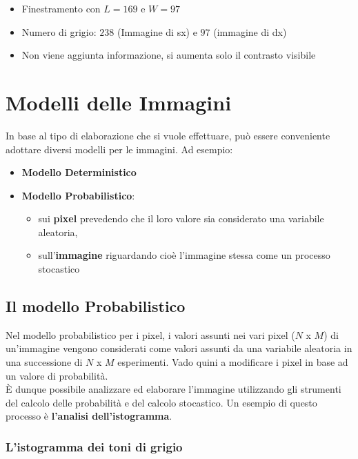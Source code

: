 \begin{itemize}
    \item Finestramento con $L = 169$ e $W = 97$
    \item Numero di grigio: $238$ (Immagine di sx) e $97$ (immagine di dx)
    \item Non viene aggiunta informazione, si aumenta solo il contrasto visibile
\end{itemize}

\section{Modelli delle Immagini}

In base al tipo di elaborazione che si vuole effettuare, può essere conveniente adottare diversi modelli per le immagini. Ad esempio:

\begin{itemize}
    \item \textbf{Modello Deterministico}
    \item \textbf{Modello Probabilistico}:
          \begin{itemize}
              \item sui \textbf{pixel} prevedendo che il loro valore sia
                    considerato una variabile aleatoria,
              \item sull'\textbf{immagine} riguardando cioè l'immagine stessa
                    come un processo stocastico

          \end{itemize}
\end{itemize}

\subsection{Il modello Probabilistico}

Nel modello probabilistico per i pixel, i valori assunti nei vari pixel ($N$ x
$M$) di un'immagine vengono considerati come valori assunti da una variabile
aleatoria in una successione di $N$ x $M$ esperimenti. Vado quini a modificare i
pixel in base ad un valore di probabilità. \\È dunque possibile analizzare ed
elaborare l'immagine utilizzando gli strumenti del calcolo delle probabilità e
del calcolo stocastico. Un esempio di questo processo è \textbf{l'analisi
    dell'istogramma}.

\subsubsection{L'istogramma dei toni di grigio}

